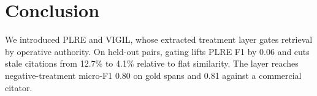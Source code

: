 \section{Conclusion}

We introduced PLRE and VIGIL, whose extracted treatment layer gates retrieval by operative authority. On held-out pairs, gating lifts PLRE F1 by 0.06 and cuts stale citations from 12.7\% to 4.1\% relative to flat similarity. The layer reaches negative-treatment micro-F1 0.80 on gold spans and 0.81 against a commercial citator.
